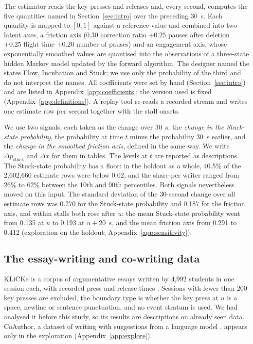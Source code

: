 The estimator reads the key presses and releases and, every second, computes the five quantities named in
Section~\ref{sec:intro} over the preceding 30~s. Each quantity is mapped to $[0, 1]$ against a reference value and combined into two latent axes, a friction
axis ($0.30$ correction ratio $+ 0.25$ pauses after deletion $+ 0.25$ flight time $+ 0.20$ number of pauses) and an
engagement axis, whose exponentially smoothed values are quantised into the observations of a three-state hidden Markov
model updated by the forward algorithm. The designer named the states Flow, Incubation and Stuck; we use only the
probability of the third and do not interpret the names. All coefficients were set by hand (Section~\ref{sec:intro}) and are listed in
Appendix~\ref{app:coefficients}; the version used is fixed (Appendix~\ref{app:definitions}). A replay tool re-reads a recorded stream and writes one
estimate row per second together with the stall onsets.

We use two signals, each taken as the change over 30~s: the \emph{change in the Stuck-state probability}, the
probability at time $t$ minus the probability 30~s earlier, and the \emph{change in the smoothed friction axis}, defined
in the same way. We write $\Delta p_{\mathrm{stuck}}$ and $\Delta x$ for them in tables. The levels at $t$ are reported
as descriptions. The Stuck-state probability has a floor: in the holdout as a whole, 40.5\% of the 2,602,660 estimate
rows were below 0.02, and the share per writer ranged from 26\% to 62\% between the 10th and 90th percentiles. Both
signals nevertheless moved on this input. The standard deviation of the 30-second change over all estimate rows was
0.270 for the Stuck-state probability and 0.187 for the friction axis, and within stalls both rose after $u$: the mean
Stuck-state probability went from 0.135 at $u$ to 0.193 at $u + 20$~s, and the mean friction axis from 0.291 to 0.412
(exploration on the holdout; Appendix~\ref{app:sensitivity}).

\subsection{The essay-writing and co-writing data}

KLiCKe is a corpus of argumentative essays written by 4,992 students in one session each, with recorded press and
release times \cite{tian2025klicke}. Sessions with fewer than 200 key presses are excluded, the boundary type is whether
the key press at $u$ is a space, newline or sentence punctuation, and no event stratum is used. We had analysed it
before this study, so its results are descriptions on already seen data. CoAuthor, a dataset of writing with suggestions
from a language model \cite{lee2022coauthor}, appears only in the exploration (Appendix~\ref{app:explore}).
